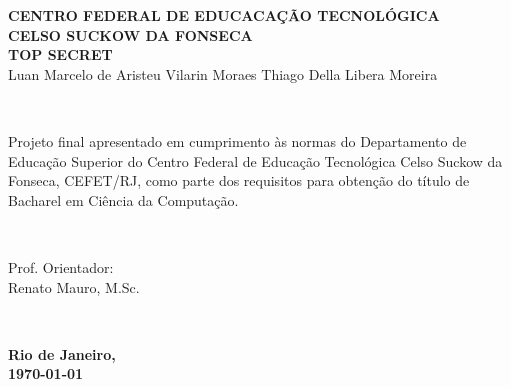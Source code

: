 \documentclass[12pt]{report} %
\begin{document}
	\begin{minipage}{\textwidth}
		\begin{center}
			{\bfseries \large CENTRO FEDERAL DE EDUCACAÇÃO TECNOLÓGICA\\ CELSO SUCKOW DA FONSECA}\\[6em]
			{\bfseries \LARGE TOP SECRET}\\[6em]%
			\normalsize
			\raggedleft Luan Marcelo de Aristeu Vilarin Moraes
			\raggedleft Thiago Della Libera Moreira
		\end{center}
	\end{minipage}\\[6em]
	
	\begin{flushright}
		\begin{minipage}{0.5\textwidth}
			\normalsize
			\raggedleft
			Projeto final apresentado em cumprimento às normas do Departamento de Educação Superior do Centro Federal de Educação Tecnológica Celso Suckow da Fonseca, CEFET/RJ, como parte dos requisitos para obtenção do título de Bacharel em Ciência da Computação.
		\end{minipage}\\[6em]
	\end{flushright}
	
	\begin{flushright}
		\begin{minipage}{0.5\textwidth}
			\raggedleft
			Prof. Orientador: \\
			Renato Mauro, M.Sc.
		\end{minipage}\\
	\end{flushright}
	\vfill	
	{\bfseries \large Rio de Janeiro,\\
		\today} %
	
	\pagebreak
	
	
	
	
	\iffalse %
	\center %
	
\end{document}
